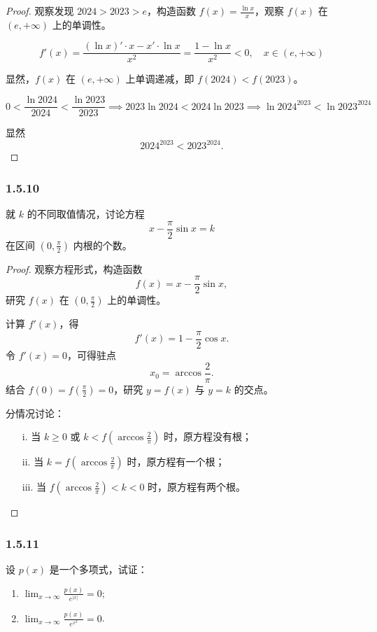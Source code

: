 \documentclass[12pt]{ctexart}
\begin{document}
\begin{proof}
观察发现 $2024 > 2023 > e$，构造函数 $f(x) = \frac{\ln x}{x}$，观察 $f(x)$ 在 $(e, +\infty)$ 上的单调性。

\[
f'(x) = \frac{(\ln x)' \cdot x - x' \cdot \ln x}{x^2} = \frac{1 - \ln x}{x^2} < 0, \quad x \in (e, +\infty)
\]

显然，$f(x)$ 在 $(e, +\infty)$ 上单调递减，即 $f(2024) < f(2023)$。

\[
0 < \frac{\ln 2024}{2024} < \frac{\ln 2023}{2023} \implies 2023 \ln 2024 < 2024 \ln 2023 \implies \ln 2024^{2023} < \ln 2023^{2024}
\]

显然
\[
2024^{2023} < 2023^{2024}.
\]
\end{proof}

\subsubsection*{1.5.10}
就 $k$ 的不同取值情况，讨论方程
\[
x - \frac{\pi}{2} \sin x = k
\]
在区间 $\left(0, \frac{\pi}{2}\right)$ 内根的个数。

\begin{proof}
观察方程形式，构造函数
\[
f(x) = x - \frac{\pi}{2} \sin x,
\]
研究 $f(x)$ 在 $\left(0, \frac{\pi}{2}\right)$ 上的单调性。

计算 $f'(x)$，得
\[
f'(x) = 1 - \frac{\pi}{2} \cos x.
\]
令 $f'(x) = 0$，可得驻点
\[
x_0 = \arccos \frac{2}{\pi}.
\]
结合 $f(0) = f\left(\frac{\pi}{2}\right) = 0$，研究 $y = f(x)$ 与 $y = k$ 的交点。

分情况讨论：
\begin{itemize}
    \item[i.] 当 $k \geq 0$ 或 $k < f\left(\arccos \frac{2}{\pi}\right)$ 时，原方程没有根；
    \item[ii.] 当 $k = f\left(\arccos \frac{2}{\pi}\right)$ 时，原方程有一个根；
    \item[iii.] 当 $f\left(\arccos \frac{2}{\pi}\right) < k < 0$ 时，原方程有两个根。
\end{itemize}
\end{proof}

\subsubsection*{1.5.11}
设 $p(x)$ 是一个多项式，试证：
\begin{enumerate}
    \item $\lim_{x \to \infty} \frac{p(x)}{e^{|x|}} = 0$;
    \item $\lim_{x \to \infty} \frac{p(x)}{e^{x^2}} = 0$.
\end{enumerate}
\end{document}
